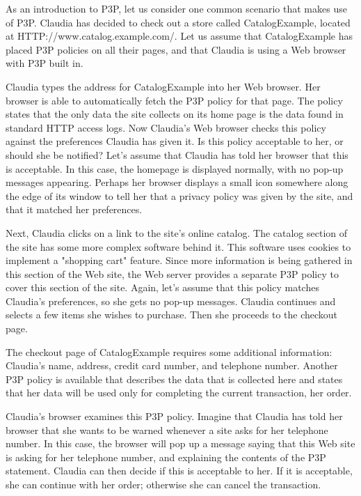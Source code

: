 As an introduction to P3P, let us consider one common scenario that makes use of P3P. Claudia has decided to check out a store called CatalogExample, located at HTTP://www.catalog.example.com/. Let us assume that CatalogExample has placed P3P policies on all their pages, and that Claudia is using a Web browser with P3P built in.

Claudia types the address for CatalogExample into her Web browser. Her browser is able to automatically fetch the P3P policy for that page. The policy states that the only data the site collects on its home page is the data found in standard HTTP access logs. Now Claudia's Web browser checks this policy against the preferences Claudia has given it. Is this policy acceptable to her, or should she be notified? Let's assume that Claudia has told her browser that this is acceptable. In this case, the homepage is displayed normally, with no pop-up messages appearing. Perhaps her browser displays a small icon somewhere along the edge of its window to tell her that a privacy policy was given by the site, and that it matched her preferences.

Next, Claudia clicks on a link to the site's online catalog. The catalog section of the site has some more complex software behind it. This software uses cookies to implement a "shopping cart" feature. Since more information is being gathered in this section of the Web site, the Web server provides a separate P3P policy to cover this section of the site. Again, let's assume that this policy matches Claudia's preferences, so she gets no pop-up messages. Claudia continues and selects a few items she wishes to purchase. Then she proceeds to the checkout page.

The checkout page of CatalogExample requires some additional information: Claudia's name, address, credit card number, and telephone number. Another P3P policy is available that describes the data that is collected here and states that her data will be used only for completing the current transaction, her order.

Claudia's browser examines this P3P policy. Imagine that Claudia has told her browser that she wants to be warned whenever a site asks for her telephone number. In this case, the browser will pop up a message saying that this Web site is asking for her telephone number, and explaining the contents of the P3P statement. Claudia can then decide if this is acceptable to her. If it is acceptable, she can continue with her order; otherwise she can cancel the transaction.

